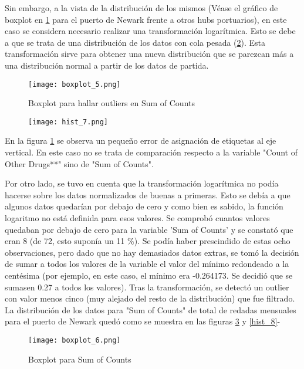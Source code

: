 \documentclass[12pt]{article}
\begin{document}
		Sin embargo, a la vista de la distribución de los mismos (Véase el gráfico de boxplot en \ref{boxplot_5} para el puerto de Newark frente a otros hubs portuarios), en este caso se considera necesario realizar una transformación logarítmica. Esto se debe a que se trata de una distribución de los datos con cola pesada (\ref{hist_7}). Esta transformación sirve para obtener una nueva distribución que se parezcan más a una distribución normal a partir de los datos de partida.
		
		
		\begin{figure}[H]
			\caption{\label{boxplot_5} Boxplot para hallar outliers en Sum of Counts}
			\centering
			\hspace*{1cm}
			\texttt{[image: boxplot\_5.png]}
		\end{figure}
	
		\begin{figure}[H]
			\caption{\label{hist_7} }
			\centering
			\hspace*{1cm}
			\texttt{[image: hist\_7.png]}
		\end{figure}
	
		En la figura \ref{boxplot_5} se observa un pequeño error de asignación de etiquetas al eje vertical. En este caso no se trata de comparación respecto a la variable "Count of  Other Drugs**" sino de "Sum of Counts".
	
		Por otro lado, se tuvo en cuenta que la transformación logarítmica no podía hacerse sobre los datos normalizados de buenas a primeras. Esto se debía a que algunos datos quedarían por debajo de cero y como bien es sabido, la función logaritmo no está definida para esos valores. Se comprobó cuantos valores quedaban por debajo de cero para la variable 'Sum of Counts' y se constató que eran 8 (de 72, esto suponía un 11 \%). Se podía haber prescindido de estas ocho observaciones, pero dado que no hay demasiados datos extras, se tomó la decisión de sumar a todos los valores de la variable el valor del mínimo redondeado a la centésima (por ejemplo, en este caso, el mínimo era -0.264173. Se decidió que se sumasen 0.27 a todos los valores). Tras la transformación, se detectó un outlier con valor menos cinco (muy alejado del resto de la distribución) que fue filtrado. La distribución de los datos para "Sum of Counts" de total de redadas mensuales para el puerto de Newark quedó como se muestra en las figuras \ref{boxplot_6} y \ref{hist_8}-
		
		\begin{figure}[H]
			\caption{\label{boxplot_6} Boxplot para Sum of Counts}
			\centering
			\hspace*{1cm}
			\texttt{[image: boxplot\_6.png]}
		\end{figure}
		
\end{document}
